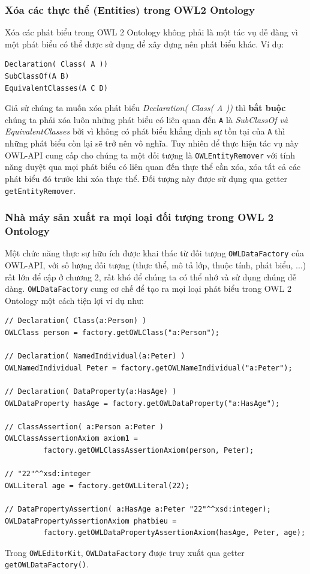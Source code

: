 \subsubsection{Xóa các thực thể (Entities) trong OWL2 Ontology}
Xóa các phát biểu trong OWL 2 Ontology không phải là một tác vụ dễ dàng vì một phát biểu có thể được sử dụng để xây dựng nên phát biểu khác. Ví dụ:
\begin{verbatim}
Declaration( Class( A ))
SubClassOf(A B)
EquivalentClasses(A C D)
\end{verbatim}
Giả sử chúng ta muốn xóa phát biểu \textit{Declaration( Class( A ))} thì \textbf{bắt buộc} chúng ta phải xóa luôn những phát biểu có liên quan đến \verb|A| là \textit{SubClassOf và EquivalentClasses}  bởi vì không có phát biểu khẳng định sự tồn tại của \verb|A| thì những phát biểu còn lại sẽ trở nên vô nghĩa. Tuy nhiên để thực hiện tác vụ này OWL-API cung cấp cho chúng ta một đối tượng là \verb|OWLEntityRemover| với tính năng duyệt qua mọi phát biểu có liên quan đến thực thể cần xóa, xóa tất cả các phát biểu đó trước khi xóa thực thể. Đối tượng này được sử dụng qua getter \verb|getEntityRemover|.

\subsubsection{Nhà máy sản xuất ra mọi loại đối tượng trong OWL 2 Ontology}
Một chức năng thực sự hữu ích được khai thác từ đối tượng \verb|OWLDataFactory| của OWL-API, với số lượng đối tượng (thực thể, mô tả lớp, thuộc tính, phát biểu, ...) rất lớn để cập ở chương 2, rất khó để chúng ta có thể nhớ và sử dụng chúng dễ dàng. \verb|OWLDataFactory| cung cơ chế để tạo ra mọi loại phát biểu trong OWL 2 Ontology một cách tiện lợi ví dụ như:
\begin{verbatim}
// Declaration( Class(a:Person) )
OWLClass person = factory.getOWLClass("a:Person");

// Declaration( NamedIndividual(a:Peter) )
OWLNamedIndividual Peter = factory.getOWLNameIndividual("a:Peter");

// Declaration( DataProperty(a:HasAge) )
OWLDataProperty hasAge = factory.getOWLDataProperty("a:HasAge");

// ClassAssertion( a:Person a:Peter )
OWLClassAssertionAxiom axiom1 = 
         factory.getOWLClassAssertionAxiom(person, Peter);
         
// "22"^^xsd:integer 
OWLLiteral age = factory.getOWLLiteral(22);

// DataPropertyAssertion( a:HasAge a:Peter "22"^^xsd:integer); 
OWLDataPropertyAssertionAxiom phatbieu = 
         factory.getOWLDataPropertyAssertionAxiom(hasAge, Peter, age);
\end{verbatim}
Trong \verb|OWLEditorKit|, \verb|OWLDataFactory| được truy xuất qua getter \verb|getOWLDataFactory()|.

